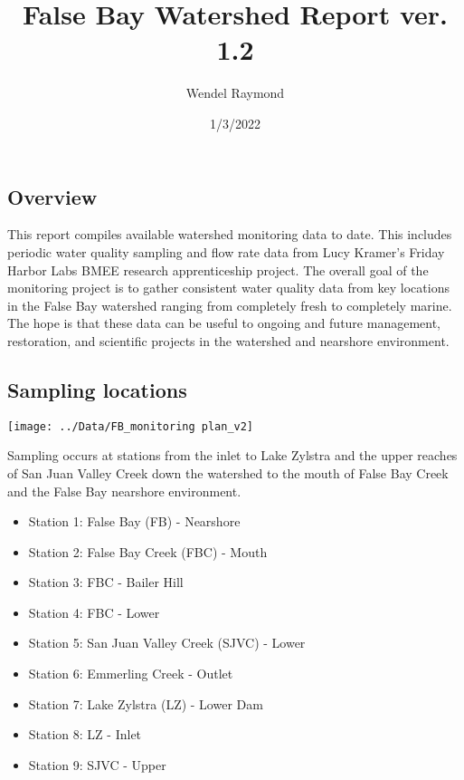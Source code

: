 \documentclass[
]{article}
\title{False Bay Watershed Report ver. 1.2}
\author{Wendel Raymond}
\date{1/3/2022}
\providecommand{\tightlist}{%
  \setlength{\itemsep}{0pt}\setlength{\parskip}{0pt}}
\begin{document}
\maketitle

\hypertarget{overview}{%
\subsection{Overview}\label{overview}}

This report compiles available watershed monitoring data to date. This
includes periodic water quality sampling and flow rate data from Lucy
Kramer's Friday Harbor Labs BMEE research apprenticeship project. The
overall goal of the monitoring project is to gather consistent water
quality data from key locations in the False Bay watershed ranging from
completely fresh to completely marine. The hope is that these data can
be useful to ongoing and future management, restoration, and scientific
projects in the watershed and nearshore environment.

\hypertarget{sampling-locations}{%
\subsection{Sampling locations}\label{sampling-locations}}

\begin{center}\texttt{[image: ../Data/FB\_monitoring plan\_v2]} \end{center}

\newpage

Sampling occurs at stations from the inlet to Lake Zylstra and the upper
reaches of San Juan Valley Creek down the watershed to the mouth of
False Bay Creek and the False Bay nearshore environment.

\begin{itemize}
\tightlist
\item
  Station 1: False Bay (FB) - Nearshore
\item
  Station 2: False Bay Creek (FBC) - Mouth
\item
  Station 3: FBC - Bailer Hill
\item
  Station 4: FBC - Lower
\item
  Station 5: San Juan Valley Creek (SJVC) - Lower
\item
  Station 6: Emmerling Creek - Outlet
\item
  Station 7: Lake Zylstra (LZ) - Lower Dam
\item
  Station 8: LZ - Inlet
\item
  Station 9: SJVC - Upper
\end{itemize}
\end{document}
